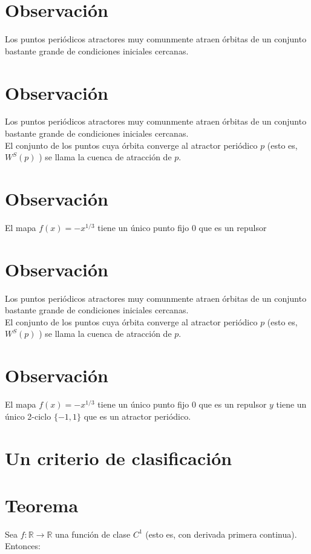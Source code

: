 \documentclass[11pt]{beamer}
\begin{document}
\section*{Observación}
Los puntos periódicos atractores muy comunmente atraen órbitas de un conjunto bastante grande de condiciones iniciales cercanas.

\section*{Observación}
Los puntos periódicos atractores muy comunmente atraen órbitas de un conjunto bastante grande de condiciones iniciales cercanas.\\
El conjunto de los puntos cuya órbita converge al atractor periódico $p$ (esto es, $W^{S}(p)$ ) se llama la cuenca de atracción de $p$.

\section*{Observación}
El mapa $f(x)=-x^{1 / 3}$ tiene un único punto fijo 0 que es un repulsor

\section*{Observación}
Los puntos periódicos atractores muy comunmente atraen órbitas de un conjunto bastante grande de condiciones iniciales cercanas.\\
El conjunto de los puntos cuya órbita converge al atractor periódico $p$ (esto es, $W^{S}(p)$ ) se llama la cuenca de atracción de $p$.

\section*{Observación}
El mapa $f(x)=-x^{1 / 3}$ tiene un único punto fijo 0 que es un repulsor $y$ tiene un único 2-ciclo $\{-1,1\}$ que es un atractor periódico.

\section*{Un criterio de clasificación}
\section*{Teorema}
Sea $f: \mathbb{R} \rightarrow \mathbb{R}$ una función de clase $C^{1}$ (esto es, con derivada primera continua). Entonces:
\end{document}
